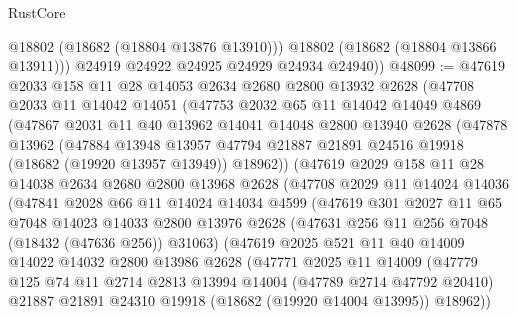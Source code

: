 \begin{lexlean}{RustCore}
\begin{coremodule}
            @18802
            (@18682 (@18804 @13876 @13910)))
          @18802
          (@18682 (@18804 @13866 @13911)))
        @24919
        @24922
        @24925
        @24929
        @24934
        @24940))
@48099 := @47619
    @2033
    @158
    @11
    @28
    @14053
    @2634
    @2680
    @2800
    @13932
    @2628
    (@47708
      @2033
      @11
      @14042
      @14051
      (@47753
        @2032
        @65
        @11
        @14042
        @14049
        @4869
        (@47867
          @2031
          @11
          @40
          @13962
          @14041
          @14048
          @2800
          @13940
          @2628
          (@47878
            @13962
            (@47884
              @13948
              @13957
              @47794
              @21887
              @21891
              @24516
              @19918
              (@18682 (@19920 @13957 @13949))
              @18962))
          (@47619
            @2029
            @158
            @11
            @28
            @14038
            @2634
            @2680
            @2800
            @13968
            @2628
            (@47708
              @2029
              @11
              @14024
              @14036
              (@47841
                @2028
                @66
                @11
                @14024
                @14034
                @4599
                (@47619
                  @301
                  @2027
                  @11
                  @65
                  @7048
                  @14023
                  @14033
                  @2800
                  @13976
                  @2628
                  (@47631 @256 @11 @256 @7048 (@18432 (@47636 @256)) @31063)
                  (@47619
                    @2025
                    @521
                    @11
                    @40
                    @14009
                    @14022
                    @14032
                    @2800
                    @13986
                    @2628
                    (@47771
                      @2025
                      @11
                      @14009
                      (@47779
                        @125
                        @74
                        @11
                        @2714
                        @2813
                        @13994
                        @14004
                        (@47789 @2714 @47792 @20410)
                        @21887
                        @21891
                        @24310
                        @19918
                        (@18682 (@19920 @14004 @13995))
                        @18962))

\end{coremodule}
\end{lexlean}

